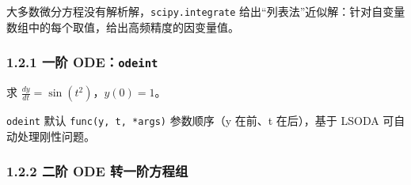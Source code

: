 大多数微分方程没有解析解，\texttt{scipy.integrate}
给出``列表法''近似解：针对自变量数组中的每个取值，给出高频精度的因变量值。

\subsubsection{\texorpdfstring{1.2.1 一阶
ODE：\texttt{odeint}}{1.2.1 一阶 ODE：odeint}}\label{ux4e00ux9636-odeodeint}

求 \(\frac{dy}{dt}=\sin(t^2)\)，\(y(0)=1\)。

\begin{Shaded}
\begin{Highlighting}[]

    \OperatorTok{**}\NormalTok{)}

\OperatorTok{=}\NormalTok{ [}\NormalTok{]}
\OperatorTok{=}\NormalTok{, }\NormalTok{, }\NormalTok{)}
\OperatorTok{=}
\NormalTok{(}\SpecialCharTok{\{}\SpecialCharTok{\}}\SpecialCharTok{\{}\NormalTok{y[}\NormalTok{,}\NormalTok{]}\SpecialCharTok{\}}\SpecialCharTok{\{}\NormalTok{y[}\OperatorTok{{-}}\NormalTok{,}\NormalTok{]}\SpecialCharTok{\}}\NormalTok{)}
\end{Highlighting}
\end{Shaded}

\begin{Shaded}
\begin{Highlighting}[]
\end{Highlighting}
\end{Shaded}

\texttt{odeint} 默认 \texttt{func(y,\ t,\ *args)} 参数顺序（y 在前、t
在后），基于 LSODA 可自动处理刚性问题。

\subsubsection{1.2.2 二阶 ODE
转一阶方程组}\label{ux4e8cux9636-ode-ux8f6cux4e00ux9636ux65b9ux7a0bux7ec4}


